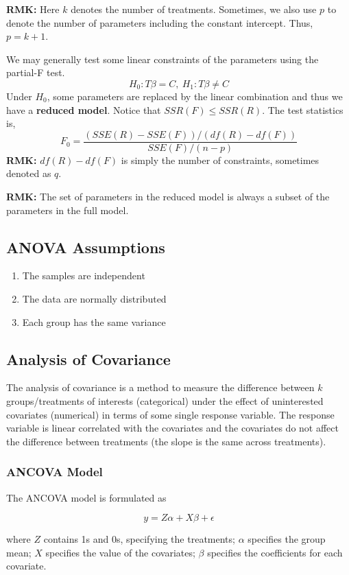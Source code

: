 \documentclass[9pt]{article}
\newcommand{\rmk}{\textbf{RMK: }}
\begin{document}
\rmk Here $k$ denotes the number of treatments. Sometimes, we also use $p$ to denote the number of parameters including the constant intercept. Thus, $p=k+1$.

We may generally test some linear constraints of the parameters using the partial-F test.
$$
H_0: T\beta =C,\ H_1: T\beta \not=C
$$
Under $H_0$, some parameters are replaced by the linear combination and thus we have a \textbf{reduced model}. Notice that $SSR(F) \le SSR(R)$. The test statistics is,
$$
F_0 = \frac{(SSE(R) - SSE(F))/(df(R)-df(F))}{SSE(F)/(n-p)}
$$
\rmk $df(R)-df(F)$ is simply the number of constraints, sometimes denoted as $q$.\par
\rmk The set of parameters in the reduced model is always a subset of the parameters in the full model.

\subsection{ANOVA Assumptions}
\begin{enumerate}
    \item The samples are independent
    \item The data are normally distributed
    \item Each group has the same variance
\end{enumerate}

\subsection{Analysis of Covariance}
The analysis of covariance is a method to measure the difference between $k$ groups/treatments of interests (categorical) under the effect of uninterested covariates (numerical) in terms of some single response variable. The response variable is linear correlated with the covariates and the covariates do not affect the difference between treatments (the slope is the same across treatments). \newline

\subsubsection{ANCOVA Model}
The ANCOVA model is formulated as

$$
y = Z\alpha + X\beta + \epsilon
$$

where $Z$ contains 1s and 0s, specifying the treatments; $\alpha$ specifies the group mean; $X$ specifies the value of the covariates; $\beta$ specifies the coefficients for each covariate. 
\end{document}
